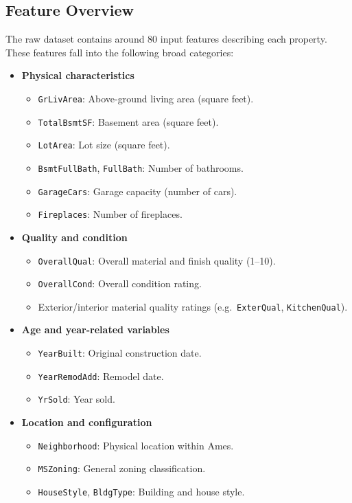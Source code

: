 \documentclass[11pt,a4paper]{article}
\begin{document}
\subsection{Feature Overview}

The raw dataset contains around 80 input features describing each property.
These features fall into the following broad categories:

\begin{itemize}[leftmargin=*]
    \item \textbf{Physical characteristics}
    \begin{itemize}
        \item \texttt{GrLivArea}: Above-ground living area (square feet).
        \item \texttt{TotalBsmtSF}: Basement area (square feet).
        \item \texttt{LotArea}: Lot size (square feet).
        \item \texttt{BsmtFullBath}, \texttt{FullBath}: Number of bathrooms.
        \item \texttt{GarageCars}: Garage capacity (number of cars).
        \item \texttt{Fireplaces}: Number of fireplaces.
    \end{itemize}
    \item \textbf{Quality and condition}
    \begin{itemize}
        \item \texttt{OverallQual}: Overall material and finish quality (1--10).
        \item \texttt{OverallCond}: Overall condition rating.
        \item Exterior/interior material quality ratings (e.g.\ \texttt{ExterQual}, \texttt{KitchenQual}).
    \end{itemize}
    \item \textbf{Age and year-related variables}
    \begin{itemize}
        \item \texttt{YearBuilt}: Original construction date.
        \item \texttt{YearRemodAdd}: Remodel date.
        \item \texttt{YrSold}: Year sold.
    \end{itemize}
    \item \textbf{Location and configuration}
    \begin{itemize}
        \item \texttt{Neighborhood}: Physical location within Ames.
        \item \texttt{MSZoning}: General zoning classification.
        \item \texttt{HouseStyle}, \texttt{BldgType}: Building and house style.
    \end{itemize}
\end{itemize}
\end{document}
